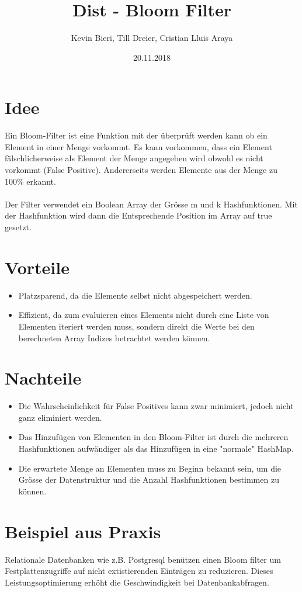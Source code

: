 \documentclass{article}
\title{Dist - Bloom Filter}
\author{Kevin Bieri, Till Dreier, Cristian Lluis Araya}
\date{20.11.2018}
\begin{document}
\maketitle

\section{Idee}
Ein Bloom-Filter ist eine Funktion mit der überprüft werden kann ob ein Element in einer Menge vorkommt. Es kann vorkommen, dass ein Element fälschlicherweise als Element der Menge angegeben wird obwohl es nicht vorkommt (False Positive). Andererseits werden Elemente aus der Menge zu 100\% erkannt.
\\
\\
Der Filter verwendet ein Boolean Array der Grösse {m} und {k} Hashfunktionen. Mit der Hashfunktion wird dann die Entsprechende Position im Array auf true gesetzt.

\section{Vorteile}
\begin{itemize}
\item Platzsparend, da die Elemente selbst nicht abgespeichert werden.
\item Effizient, da zum evaluieren eines Elements nicht durch eine Liste von Elementen iteriert werden muss, sondern direkt die Werte bei den berechneten Array Indizes betrachtet werden können.
\end{itemize}

\section{Nachteile}
\begin{itemize}
\item Die Wahrscheinlichkeit für False Positives kann zwar minimiert, jedoch nicht ganz eliminiert werden.
\item Das Hinzufügen von Elementen in den Bloom-Filter ist durch die mehreren Hashfunktionen aufwändiger als das Hinzufügen in eine "normale" HashMap.
\item Die erwartete Menge an Elementen muss zu Beginn bekannt sein, um die Grösse der Datenstruktur und die Anzahl Hashfunktionen bestimmen zu können.
\end{itemize}

\section{Beispiel aus Praxis}
Relationale Datenbanken wie z.B. Postgresql benützen einen Bloom filter um Festplattenzugriffe auf nicht extistierenden Einträgen zu reduzieren. Dieses Leistungsoptimierung erhöht die Geschwindigkeit bei Datenbankabfragen.
\end{document}
